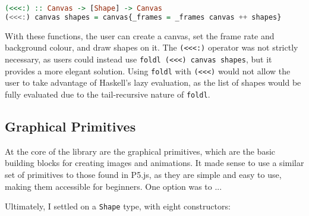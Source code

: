 \documentclass[../main.tex]{subfiles}
\begin{document}
            \begin{minipage}{\linewidth}
                \begin{lstlisting}[language=Haskell, label={lst:<<<:}, caption={The operator to append an
                    entire list of frames to the canvas.}]
(<<<:) :: Canvas -> [Shape] -> Canvas
(<<<:) canvas shapes = canvas{_frames = _frames canvas ++ shapes}
                \end{lstlisting}
            \end{minipage}

            With these functions, the user can create a canvas, set the frame rate and
                background colour, and draw shapes on it.
            The \verb|(<<<:)| operator was not strictly necessary, as users could instead
                use \verb|foldl (<<<) canvas shapes|, but it provides a more elegant solution.
            Using \verb|foldl| with \verb|(<<<)| would not allow the user to take advantage
                of Haskell's lazy evaluation, as the list of shapes would be fully evaluated
                due to the tail-recursive nature of \verb|foldl|.

        \subsection{Graphical Primitives}
            At the core of the library are the graphical primitives, which are the basic
                building blocks for creating images and animations.
            It made sense to use a similar set of primitives to those found in P5.js, as
                they are simple and easy to use, making them accessible for beginners.
            One option was to ... %

            Ultimately, I settled on a \verb|Shape| type, with eight constructors:
\end{document}
